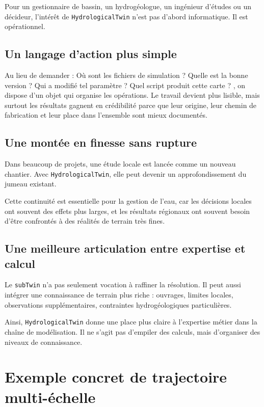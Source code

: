 \documentclass[11pt,a4paper]{article}
\newcommand{\hydrot}{\texttt{HydrologicalTwin}}
\begin{document}
Pour un gestionnaire de bassin, un hydrogéologue, un ingénieur d'études ou un décideur, l'intérêt de \hydrot{} n'est pas d'abord informatique. Il est opérationnel.

\subsection{Un langage d'action plus simple}

Au lieu de demander : \og Où sont les fichiers de simulation ? Quelle est la bonne version ? Qui a modifié tel paramètre ? Quel script produit cette carte ? \fg{}, on dispose d'un objet qui organise les opérations. Le travail devient plus lisible, mais surtout les résultats gagnent en crédibilité parce que leur origine, leur chemin de fabrication et leur place dans l'ensemble sont mieux documentés.

\subsection{Une montée en finesse sans rupture}

Dans beaucoup de projets, une étude locale est lancée comme un nouveau chantier. Avec \hydrot{}, elle peut devenir un approfondissement du jumeau existant.

Cette continuité est essentielle pour la gestion de l'eau, car les décisions locales ont souvent des effets plus larges, et les résultats régionaux ont souvent besoin d'être confrontés à des réalités de terrain très fines.

\subsection{Une meilleure articulation entre expertise et calcul}

Le \texttt{subTwin} n'a pas seulement vocation à raffiner la résolution. Il peut aussi intégrer une connaissance de terrain plus riche : ouvrages, limites locales, observations supplémentaires, contraintes hydrogéologiques particulières.

Ainsi, \hydrot{} donne une place plus claire à l'expertise métier dans la chaîne de modélisation. Il ne s'agit pas d'empiler des calculs, mais d'organiser des niveaux de connaissance.

\section{Exemple concret de trajectoire multi-échelle}
\end{document}
